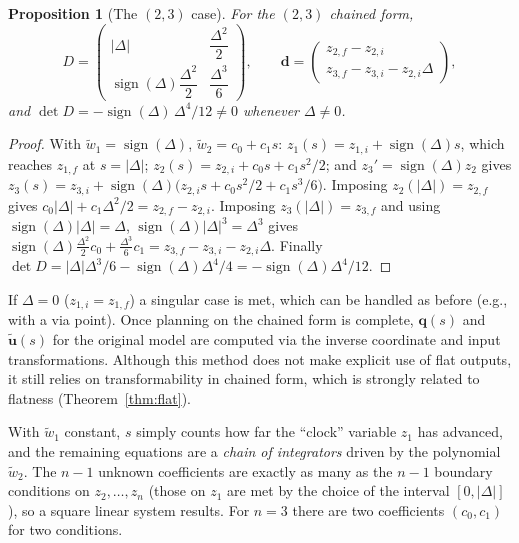 \documentclass[11pt,a4paper]{article}
\newcommand{\q}{\boldsymbol{q}}
\newcommand{\ut}{\tilde{\boldsymbol{u}}}
\newcommand{\wwt}{\tilde w}
\newcommand{\sign}{\operatorname{sign}}
\theoremstyle{definition}
\theoremstyle{plain}
\newtheorem{proposition}[definition]{Proposition}
\theoremstyle{remark}
\begin{document}
\begin{proposition}[The $(2,3)$ case]
For the $(2,3)$ chained form,
\begin{equation}
D=\begin{pmatrix}|\Delta|&\dfrac{\Delta^2}{2}\\[6pt]\sign(\Delta)\dfrac{\Delta^2}{2}&\dfrac{\Delta^3}{6}\end{pmatrix},\qquad
\boldsymbol d=\begin{pmatrix}z_{2,f}-z_{2,i}\\ z_{3,f}-z_{3,i}-z_{2,i}\Delta\end{pmatrix},
\end{equation}
and $\det D=-\sign(\Delta)\,\Delta^4/12\ne0$ whenever $\Delta\ne0$.
\end{proposition}
\begin{proof}
With $\wwt_1=\sign(\Delta)$, $\wwt_2=c_0+c_1s$: $z_1(s)=z_{1,i}+\sign(\Delta)s$, which reaches $z_{1,f}$ at $s=|\Delta|$;
$z_2(s)=z_{2,i}+c_0s+c_1s^2/2$; and $z_3'=\sign(\Delta)z_2$ gives
$z_3(s)=z_{3,i}+\sign(\Delta)\big(z_{2,i}s+c_0s^2/2+c_1s^3/6\big)$. Imposing $z_2(|\Delta|)=z_{2,f}$ gives
$c_0|\Delta|+c_1\Delta^2/2=z_{2,f}-z_{2,i}$. Imposing $z_3(|\Delta|)=z_{3,f}$ and using $\sign(\Delta)|\Delta|=\Delta$,
$\sign(\Delta)|\Delta|^3=\Delta^3$ gives
$\sign(\Delta)\tfrac{\Delta^2}{2}c_0+\tfrac{\Delta^3}{6}c_1=z_{3,f}-z_{3,i}-z_{2,i}\Delta$.
Finally $\det D=|\Delta|\Delta^3/6-\sign(\Delta)\Delta^4/4=-\sign(\Delta)\Delta^4/12$. \qedhere
\end{proof}

If $\Delta=0$ ($z_{1,i}=z_{1,f}$) a singular case is met, which can be handled as before (e.g., with a via point). Once planning
on the chained form is complete, $\q(s)$ and $\ut(s)$ for the original model are computed via the inverse coordinate and
input transformations. Although this method does not make explicit use of flat outputs, it still relies on transformability in chained form,
which is strongly related to flatness (Theorem~\ref{thm:flat}).

\begin{intuition}
With $\wwt_1$ constant, $s$ simply counts how far the ``clock'' variable $z_1$ has advanced, and the remaining equations are a
\emph{chain of integrators} driven by the polynomial $\wwt_2$. The $n-1$ unknown coefficients are exactly as many as the
$n-1$ boundary conditions on $z_2,\dots,z_n$ (those on $z_1$ are met by the choice of the interval $[0,|\Delta|]$), so a
square linear system results. For $n=3$ there are two coefficients $(c_0,c_1)$ for two conditions.
\end{intuition}
\end{document}
